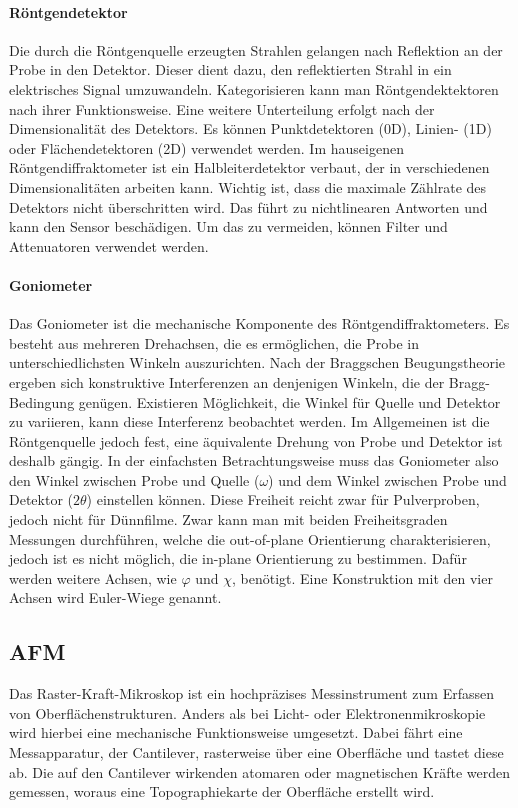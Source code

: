 \paragraph{Röntgendetektor}
Die durch die Röntgenquelle erzeugten Strahlen gelangen nach Reflektion an der Probe in den Detektor.
Dieser dient dazu, den reflektierten Strahl in ein elektrisches Signal umzuwandeln.
Kategorisieren kann man Röntgendektektoren nach ihrer Funktionsweise.
Eine weitere Unterteilung erfolgt nach der Dimensionalität des Detektors.
Es können Punktdetektoren (0D), Linien- (1D) oder Flächendetektoren (2D) verwendet werden.
Im hauseigenen Röntgendiffraktometer ist ein Halbleiterdetektor verbaut, der in verschiedenen Dimensionalitäten
arbeiten kann.
Wichtig ist, dass die maximale Zählrate des Detektors nicht überschritten wird.
Das führt zu nichtlinearen Antworten und kann den Sensor beschädigen.
Um das zu vermeiden, können Filter und Attenuatoren verwendet werden.

\paragraph{Goniometer}
Das Goniometer ist die mechanische Komponente des Röntgendiffraktometers.
Es besteht aus mehreren Drehachsen, die es ermöglichen, die Probe in unterschiedlichsten Winkeln auszurichten.
Nach der Braggschen Beugungstheorie ergeben sich konstruktive Interferenzen an denjenigen Winkeln, die der
Bragg-Bedingung genügen.
Existieren Möglichkeit, die Winkel für Quelle und Detektor zu variieren, kann diese Interferenz beobachtet werden.
Im Allgemeinen ist die Röntgenquelle jedoch fest, eine äquivalente Drehung von Probe und Detektor ist deshalb gängig.
In der einfachsten Betrachtungsweise muss das Goniometer also den Winkel zwischen Probe und Quelle ($\omega$) und dem
Winkel zwischen Probe und Detektor ($2\theta$) einstellen können.
Diese Freiheit reicht zwar für Pulverproben, jedoch nicht für Dünnfilme.
Zwar kann man mit beiden Freiheitsgraden Messungen durchführen, welche die out-of-plane Orientierung charakterisieren,
jedoch ist es nicht möglich, die in-plane Orientierung zu bestimmen.
Dafür werden weitere Achsen, wie $\varphi$ und $\chi$, benötigt.
Eine Konstruktion mit den vier Achsen wird Euler-Wiege genannt.



\subsection{AFM}\label{subsec:afm}
Das Raster-Kraft-Mikroskop ist ein hochpräzises Messinstrument zum Erfassen von Oberflächenstrukturen.
Anders als bei Licht- oder Elektronenmikroskopie wird hierbei eine mechanische Funktionsweise umgesetzt.
Dabei fährt eine Messapparatur, der Cantilever, rasterweise über eine Oberfläche und tastet diese ab.
Die auf den Cantilever wirkenden atomaren oder magnetischen Kräfte werden gemessen, woraus eine Topographiekarte der
Oberfläche erstellt wird.

